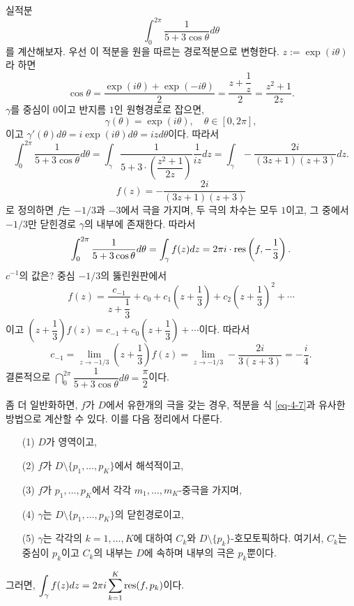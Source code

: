 \begin{saltexample}[label=example-4-18]{}{}
실적분
\[
\int_0^{2\pi} \dfrac1{5 + 3\cos\theta} d\theta
\]
를 계산해보자.
우선 이 적분을 원을 따르는 경로적분으로 변형한다.
$z:=\exp(i\theta)$라 하면
\[
\cos\theta = \dfrac{\exp(i\theta) + \exp(-i\theta)}2 
= \dfrac{z+ \dfrac1z}2 = \dfrac{z^2+1}{2z}.
\]
$\gamma$를 중심이 $0$이고 반지름 $1$인 원형경로로 잡으면,
\[
\gamma(\theta) = \exp(i\theta), \quad \theta \in [0,2\pi],
\]
이고 $\gamma'(\theta) d\theta = i\exp(i\theta)d\theta = izd\theta$이다.
따라서
\[
\int_0^{2\pi} \dfrac1{5 + 3\cos\theta} d\theta
= \int_\gamma \dfrac1{5+3\cdot\left(\dfrac{z^2+1}{2z}\right)}
\dfrac1{iz}dz
= \int_\gamma - \dfrac{2i}{(3z+1)(z+3)}dz.
\]
\[
f(z) = - \dfrac{2i}{(3z+1)(z+3)}
\]
로 정의하면 $f$는 $-1/3$과 $-3$에서 극을 가지며,
두 극의 차수는 모두 $1$이고,
그 중에서 $-1/3$만 닫힌경로 $\gamma$의 내부에 존재한다.
따라서
\[
\int_0^{2\pi} \displaystyle\frac1{5 + 3\cos\theta} d\theta
= \int_\gamma f(z)dz = 2\pi i \cdot \mathop{\mathrm{res}}\left(f, -\displaystyle\frac13\right).
\]
$c^{-1}$의 값은? 중심 $-1/3$의 뚫린원판에서
\[
f(z) = \dfrac{c_{-1}}{z+ \dfrac13} + c_0 + c_1\left(z + \dfrac13\right)
+ c_2\left(z+\dfrac13\right)^2 + \cdots
\]
이고 $\left(z+\dfrac13\right) f(z) = c_{-1} + c_0\left(z + \dfrac13\right) + \cdots$이다.
따라서
\[
c_{-1} = \lim_{z\to -1/3} \left(z+\dfrac13\right) f(z)
= \lim_{z\to -1/3} - \dfrac{2i}{3(z+3)} = - \dfrac i4.
\]
결론적으로 $\dint_0^{2\pi} \dfrac1{5 + 3\cos\theta} d\theta = \dfrac\pi2$이다.
\end{saltexample}

좀 더 일반화하면, $f$가 $D$에서 유한개의 극을 갖는 경우,
적분을 식 \eqref{eq-4-7}과 유사한 방법으로 계산할 수 있다.
이를 다음 정리에서 다룬다.

\begin{salttheorem} [유수정리] {}{} \label{thm-4-11}

\begin{itemize}
\item[(1)] $D$가 영역이고,
\item[(2)] $f$가 $D\setminus \{p_1, \ldots, p_K\}$에서 해석적이고,
\item[(3)] $f$가 $p_1, \ldots, p_K$에서 각각 $m_1, \ldots, m_K$-중극을 가지며,
\item[(4)] $\gamma$는 $D\setminus \{p_1, \ldots, p_K\}$의 닫힌경로이고,
\item[(5)] $\gamma$는 각각의 $k=1,\ldots, K$에 대하여
$C_k$와 $D\setminus\{p_k\}$-호모토픽하다.
여기서, $C_k$는 중심이 $p_k$이고 $C_k$의 내부는 $D$에 속하며 
내부의 극은 $p_k$뿐이다.
\end{itemize}
그러면, $\displaystyle\int_\gamma f(z)dz = 2\pi i \sum\limits_{k=1}^K \mathop{\mathrm{res}}(f,p_k)$이다.
\end{salttheorem}

